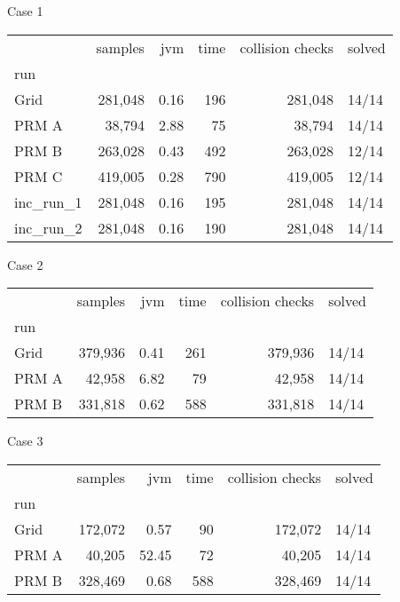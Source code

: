 Case 1
\begin{tabular}{lrrrrl}
\toprule
{} & samples &  jvm & time & collision checks & solved \\
run       &         &      &      &                  &        \\
\midrule
Grid      & 281,048 & 0.16 &  196 &          281,048 &  14/14 \\
PRM A     &  38,794 & 2.88 &   75 &           38,794 &  14/14 \\
PRM B     & 263,028 & 0.43 &  492 &          263,028 &  12/14 \\
PRM C     & 419,005 & 0.28 &  790 &          419,005 &  12/14 \\
inc\_run\_1 & 281,048 & 0.16 &  195 &          281,048 &  14/14 \\
inc\_run\_2 & 281,048 & 0.16 &  190 &          281,048 &  14/14 \\
\bottomrule
\end{tabular}


Case 2
\begin{tabular}{lrrrrl}
\toprule
{} & samples &  jvm & time & collision checks & solved \\
run   &         &      &      &                  &        \\
\midrule
Grid  & 379,936 & 0.41 &  261 &          379,936 &  14/14 \\
PRM A &  42,958 & 6.82 &   79 &           42,958 &  14/14 \\
PRM B & 331,818 & 0.62 &  588 &          331,818 &  14/14 \\
\bottomrule
\end{tabular}


Case 3
\begin{tabular}{lrrrrl}
\toprule
{} & samples &   jvm & time & collision checks & solved \\
run   &         &       &      &                  &        \\
\midrule
Grid  & 172,072 &  0.57 &   90 &          172,072 &  14/14 \\
PRM A &  40,205 & 52.45 &   72 &           40,205 &  14/14 \\
PRM B & 328,469 &  0.68 &  588 &          328,469 &  14/14 \\
\bottomrule
\end{tabular}



